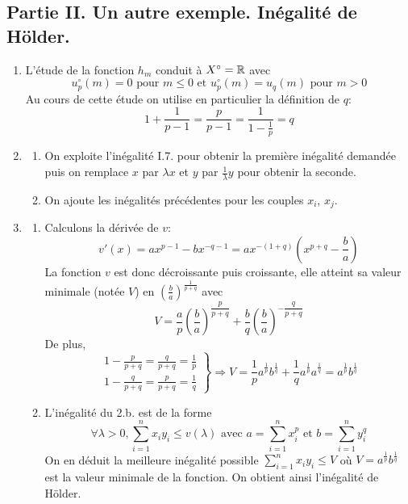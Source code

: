\subsection*{Partie II. Un autre exemple. Inégalité de Hölder.}
\begin{enumerate}
\item L'étude de la fonction $h_m$ conduit à $X^\circ=\mathbb{R}$ avec
\begin{displaymath}
 u_p^\circ(m)=0 \text{ pour } m\leq 0 \text{ et } u_p^\circ(m)=u_q(m) \text{ pour } m>0
\end{displaymath}
Au cours de cette étude on utilise en particulier la définition de $q$:
\begin{displaymath}
 1+\frac{1}{p-1}=\frac{p}{p-1}=\frac{1}{1-\frac{1}{p}}=q
\end{displaymath}

\item \begin{enumerate}
\item On exploite l'inégalité I.7. pour obtenir la première inégalité demandée puis on remplace $x$ par $\lambda x$ et $y$ par $\frac{1}{\lambda}y$ pour obtenir la seconde.
\item On ajoute les inégalités précédentes pour les couples $x_i$, $x_j$.
\end{enumerate}
\item
\begin{enumerate}
\item Calculons la dérivée de $v$:
\begin{displaymath}
 v'(x)=ax^{p-1}-bx^{-q-1}=ax^{-(1+q)}\left(x^{p+q}-\frac{b}{a} \right) 
\end{displaymath}
La fonction $v$ est donc décroissante puis croissante, elle atteint sa valeur minimale (notée $V$) en $(\frac{b}{a})^{\frac{1}{p+q}}$ avec 
\begin{displaymath}
 V = \frac{a}{p}(\frac{b}{a})^{\dfrac{p}{p+q}}+\frac{b}{q}(\frac{b}{a})^{-\dfrac{q}{p+q}}
\end{displaymath}
De plus,
\begin{displaymath}
\left. 
\begin{aligned}
 1-\frac{p}{p+q}=\frac{q}{p+q}=\frac{1}{p}\\
 1-\frac{q}{p+q}=\frac{p}{p+q}=\frac{1}{q}
\end{aligned}
\right\rbrace 
\Rightarrow
V=\frac{1}{p}a^{\frac{1}{p}}b^{\frac{1}{q}}+\frac{1}{q}a^{\frac{1}{p}}a^{\frac{1}{q}}
=a^{\frac{1}{p}}b^{\frac{1}{q}}
\end{displaymath}

\item L'inégalité du 2.b. est de la forme
\begin{displaymath}
 \forall \lambda>0, \sum_{i=1}^nx_iy_i\leq v(\lambda)\text{ avec }a=\sum_{i=1}^nx_i^p\text{ et }
b=\sum_{i=1}^ny_i^q
\end{displaymath}
On en déduit la meilleure inégalité possible $\sum_{i=1}^nx_iy_i\leq V$ où $V=a^{\frac{1}{p}}b^{\frac{1}{q}}$ est la valeur minimale de la fonction. On obtient ainsi l'inégalité de Hölder.
\end{enumerate}
 
\end{enumerate}
